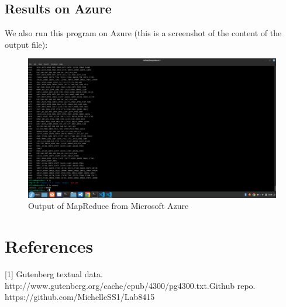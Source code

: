 \documentclass[11pt]{article}
\begin{document}
\begin{justifying}
\subsection{Results on Azure}
We also run this program on Azure (this is a screenshot of the content of the output file):
\begin{figure}[H]
    \includegraphics[width=\linewidth]{azure.png}
    \caption{Output of MapReduce from Microsoft Azure}
    \label{fig:mrazure}
\end{figure}

\end{justifying}

\section{References}
[1] Gutenberg textual data. http://www.gutenberg.org/cache/epub/4300/pg4300.txt.\newline
[2] Github repo. https://github.com/MichelleSS1/Lab8415
\end{document}
